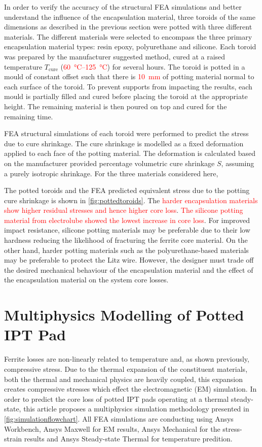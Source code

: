 \documentclass[conference]{IEEEtran}
\begin{document}
In order to verify the accuracy of the structural FEA simulations and better understand the influence of the encapsulation material, three toroids of the same dimensions as described in the previous section were potted with three different materials.
The different materials were selected to encompass the three primary encapsulation material types: resin epoxy, polyurethane and silicone. 
Each toroid was prepared by the manufacturer suggested method, cured at a raised temperature $T_\text{cure}$ (\textcolor{red}{\SIrange{60}{125}{\celsius}}) for several hours. 
The toroid is potted in a mould of constant offset such that there is \textcolor{red}{\SI{10}{\milli\meter}} of potting material normal to each surface of the toroid. 
To prevent supports from impacting the results, each mould is partially filled and cured before placing the toroid at the appropriate height. 
The remaining material is then poured on top and cured for the remaining time. 

FEA structural simulations of each toroid were performed to predict the stress due to cure shrinkage. 
The cure shrinkage is modelled as a fixed deformation applied to each face of the potting material. 
The deformation is calculated based on the manufacturer provided percentage volumetric cure shrinkage $S$, assuming a purely isotropic shrinkage.
For the three materials considered here, 

The potted toroids and the FEA predicted equivalent stress due to the potting cure shrinkage is shown in \cref{fig:pottedtoroids}.
The \textcolor{red}{harder encapsulation materials show higher residual stresses and hence higher core loss}. 
\textcolor{red}{The silicone potting material from electrolube showed the lowest increase in core loss}.
For improved impact resistance, silicone potting materials may be preferable due to their low hardness reducing the likelihood of fracturing the ferrite core material. 
On the other hand, harder potting materials such as the polyurethane-based materials may be preferable to protect the Litz wire. 
However, the designer must trade off the desired mechanical behaviour of the encapsulation material and the effect of the encapsulation material on the system core losses. 

\section{Multiphysics Modelling of Potted IPT Pad}
\label{sec:modelling}

Ferrite losses are non-linearly related to temperature and, as shown previously, compressive stress. 
Due to the thermal expansion of the constituent materials, both the thermal and mechanical physics are heavily coupled, this expansion creates compressive stresses which effect the electromagnetic (EM) simulation. 
In order to predict the core loss of potted IPT pads operating at a thermal steady-state, this article proposes a multiphysics simulation methodology presented in \cref{fig:simulationflowchart}. 
All FEA simulations are conducting using Ansys Workbench, Ansys Maxwell for EM results, Ansys Mechanical for the stress-strain results and Ansys Steady-state Thermal for temperature predition. 
\end{document}
